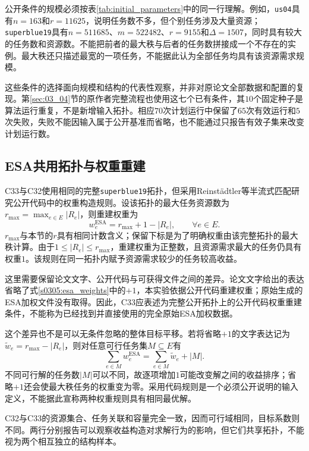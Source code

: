 公开条件的规模必须按表\ref{tab:initial_parameters}中的同一行理解。例如，\texttt{us04}具有$n=163$和$r=11625$，说明任务数不多，但个别任务涉及大量资源；\texttt{superblue19}具有$n=511685$、$m=522482$、$r=9155$和$\Delta=1507$，同时具有较大的任务数和资源数。不能把前者的最大秩与后者的任务数拼接成一个不存在的实例。最大秩还只描述最宽的一项任务，不能据此认为全部任务均具有该资源需求规模。

这些条件的选择面向规模和结构的代表性观察，并非对原论文全部数据和配置的复现。第\ref{sec:03_04}节的原作者完整流程也使用这七个已有条件，其$10$个固定种子是算法运行重复，不是新增输入拓扑。相应$70$次计划运行中保留了$65$次有效运行和$5$次失败，失败不能因输入属于公开基准而省略，也不能通过只报告有效子集来改变计划运行数。

\subsection{ESA共用拓扑与权重重建}

C33与C32使用相同的完整\texttt{superblue19}拓扑，但采用Reinstädtler等半流式匹配研究公开代码中的权重构造规则\cite{ReinstadtlerFPU2025}。设该拓扑的最大任务资源数为$r_{\max}=\max_{e\in E}|R_e|$，则重建权重为
\begin{equation}
 w_e^{\mathrm{ESA}}=r_{\max}+1-|R_e|,
 \qquad \forall e\in E.
 \label{s0305:esa_weights}
\end{equation}
$r_{\max}$与本节的$r$具有相同计数含义；保留下标是为了明确权重由该完整拓扑的最大秩计算。由于$1\leq|R_e|\leq r_{\max}$，重建权重为正整数，且资源需求最大的任务仍具有权重$1$。该规则在同一拓扑内赋予资源需求较少的任务较高收益。

这里需要保留论文文字、公开代码与可获得文件之间的差异。论文文字给出的表达省略了式\eqref{s0305:esa_weights}中的$+1$，本实验依据公开代码重建权重；原始生成的ESA加权文件没有取得。因此，C33应表述为完整公开拓扑上的公开代码权重重建条件，不能称为已经找到并直接使用的完全原始ESA加权数据。

这个差异也不是可以无条件忽略的整体目标平移。若将省略$+1$的文字表达记为$\widetilde w_e=r_{\max}-|R_e|$，则对任意可行任务集$M\subseteq E$有
\begin{equation}
 \sum_{e\in M}w_e^{\mathrm{ESA}}
 =\sum_{e\in M}\widetilde w_e+|M|.
 \label{s0305:esa_shift}
\end{equation}
不同可行解的任务数$|M|$可以不同，故逐项增加$1$可能改变解之间的收益排序；省略$+1$还会使最大秩任务的权重变为零。采用代码规则是一个必须公开说明的输入定义，不能据此宣称两种权重规则具有相同最优解。

C32与C33的资源集合、任务关联和容量完全一致，因而可行域相同，目标系数则不同。两行分别报告可以观察收益构造对求解行为的影响，但它们共享拓扑，不能视为两个相互独立的结构样本。

